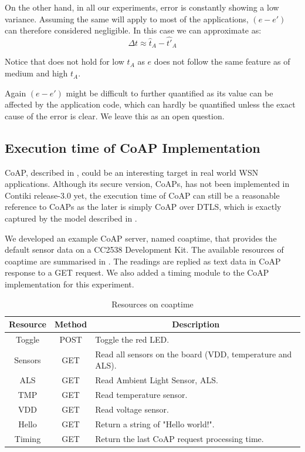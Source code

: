 On the other hand,  in all our experiments, error is constantly showing a low variance. Assuming the same will apply to most of the applications, $(e - e')$ can therefore considered negligible. In this case we can approximate  as:
\begin{equation} \label{Delta t approx}
	\Delta t \approx  \hat{t}_A - \hat{t'}_A
\end{equation}

Notice that  does not hold for low $t_A$ as $e$ does not follow the same feature as of  medium and high $t_A$.

Again $(e - e')$ might be difficult to further quantified as its value can be affected by the application code, which can hardly be quantified unless the exact cause of the error is clear. We leave this as an open question.

\subsection{Execution time of CoAP Implementation}

CoAP, described in , could be an interesting target in real world WSN applications. Although its secure version, CoAPs, has not been implemented in Contiki release-3.0 yet, the execution time of CoAP can still be a reasonable reference to CoAPs as the later is simply CoAP over DTLS, which is exactly captured by the model described in .

We developed an example CoAP server, named coaptime, that provides the default sensor data on a CC2538 Development Kit. The available resources of coaptime are summarised in . The readings are replied as text data in CoAP response to a GET request. We also added a timing module to the CoAP implementation for this experiment. 

\begin{table}[ht!]
	\center
	\begin{tabular}{|c|c|l|}
		\hline
		Resource & Method & \multicolumn{1}{c|}{Description}                          \\ \hline
		Toggle   & POST   & Toggle the red LED.                                       \\ \hline
		Sensors  & GET    & Read all sensors on the board (VDD, temperature and ALS). \\ \hline
		ALS      & GET    & Read Ambient Light Sensor, ALS.                           \\ \hline
		TMP      & GET    & Read temperature sensor.                                  \\ \hline
		VDD      & GET    & Read voltage sensor.                                      \\ \hline
		Hello    & GET    & Return a string of "Hello world!".                        \\ \hline
		Timing   & GET    & Return the last CoAP request processing time.             \\ \hline
	\end{tabular}
	\caption{Resources on coaptime}
	\label{Tbl: Resources on coaptime}
\end{table}


